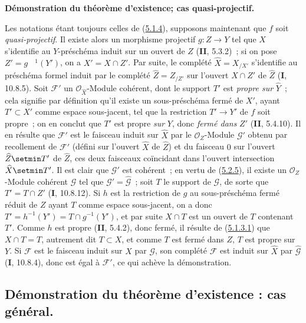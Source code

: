 \begin{env}[5.2.6]
\label{III.5.2.6-fr}
\textbf{Démonstration du théorème d'existence; cas quasi-projectif.}

Les notations étant toujours celles de (\hyperref[III.5.1.4-fr]{5.1.4}), supposons
maintenant que $f$ soit \emph{quasi-projectif}. Il existe alors un morphisme projectif
$g:Z\to Y$ tel que $X$ s'identifie au $Y$-préschéma induit sur un ouvert de $Z$
(\textbf{II}, 5.3.2)~; si on pose $Z'=g^{\phantom{-}1}(Y')$, on a $X'=X\cap Z'$. Par suite, le
complété $\widehat X=X_{/X'}$ s'identifie au préschéma formel induit par le complété
$\widehat Z=Z_{/Z'}$ sur l'ouvert $X\cap Z'$ de $\widehat Z$ (\textbf{I}, 10.8.5). Soit
$\mathcal F'$ un $\mathcal O_{\widehat X}$-Module cohérent, dont le support $T'$ est
\emph{propre sur} $\widehat Y$~; cela signifie par définition qu'il existe un sous-préschéma
fermé de $X'$, ayant $T'\subset X'$ comme espace sous-jacent, tel que la restriction
$T'\to Y'$ de $f$ soit propre~; on en conclut que $T'$ est propre \emph{sur} $Y$, donc
\emph{fermé dans} $Z'$ (\textbf{II}, 5.4.10). Il en résulte que $\mathcal F'$ est le faisceau induit
sur $\widehat X$ par le $\mathcal O_Z$-Module $\mathcal G'$ obtenu par
recollement de $\mathcal F'$ (défini sur l'ouvert $\widehat X$ de $\widehat Z$) et
du faisceau $0$ sur l'ouvert $\widehat Z\setmin T'$ de $\widehat Z$, ces deux faisceaux
coïncidant dans l'ouvert intersection $\widehat X\setmin T'$. Il est clair que
$\mathcal G'$ est cohérent~; en vertu de
(\hyperref[III.5.2.5-fr]{5.2.5}), il existe un $\mathcal O_Z$-Module cohérent
$\mathcal G$ tel que $\mathcal G'=\widehat{\mathcal G}$~; soit $T$ le support de
$\mathcal G$, de sorte que $T'=T\cap Z'$ (\textbf{I}, 10.8.12). Si $h$ est la restriction
de $g$ au sous-préschéma fermé réduit de $Z$ ayant $T$ comme espace sous-jacent, on
a donc $T'=h^{-1}(Y')=T\cap g^{-1}(Y')$, et par suite $X\cap T$ est un ouvert de
$T$ contenant $T'$.
Comme $h$ est propre (\textbf{II}, 5.4.2), donc fermé, il résulte de
(\hyperref[III.5.1.3.1-fr]{5.1.3.1}) que $X\cap T=T$, autrement dit $T\subset X$,
et comme $T$ est fermé dans $Z$, $T$ est propre sur $Y$. Si $\mathcal F$ est le
faisceau induit sur $X$ par $\mathcal G$, son complété $\widehat{\mathcal F}$ est
induit sur $\widehat X$ par $\widehat{\mathcal G}$ (\textbf{I}, 10.8.4), donc est égal à
$\mathcal F'$, ce qui achève la démonstration.
\end{env}

\subsection{Démonstration du théorème d'existence : cas général.}
\label{subsection:III.5.3-fr}


